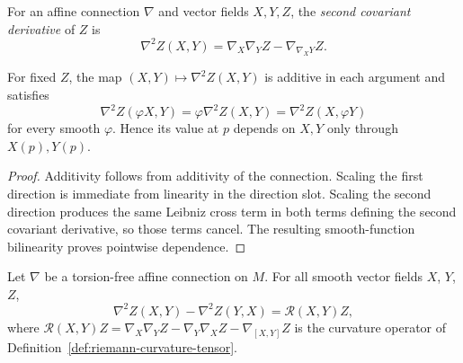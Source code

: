 \begin{definition}
\label{def:second-covariant-derivative-vector-field}
\leanok



For an affine connection $\nabla$ and vector fields $X,Y,Z$, the
\emph{second covariant derivative} of $Z$ is
\[
  \nabla^2Z(X,Y)=\nabla_X\nabla_YZ-\nabla_{\nabla_XY}Z.
\]
\end{definition}

\begin{lemma}
\label{lem:second-covariant-derivative-tensorial}



For fixed $Z$, the map $(X,Y)\mapsto\nabla^2Z(X,Y)$ is additive in
each argument and satisfies
\[
  \nabla^2Z(\varphi X,Y)=\varphi\nabla^2Z(X,Y)
  =\nabla^2Z(X,\varphi Y)
\]
for every smooth $\varphi$. Hence its value at $p$ depends on $X,Y$
only through $X(p),Y(p)$.
\end{lemma}

\begin{proof}
\sketch
{}
\leanok
Additivity follows from additivity of the connection. Scaling the first direction is immediate from linearity in the direction slot. Scaling the second direction produces the same Leibniz cross term in both terms defining the second covariant derivative, so those terms cancel. The resulting smooth-function bilinearity proves pointwise dependence.
\end{proof}

\begin{lemma}
\label{lem:ricci-commutation-vector-field}
\leanok



Let $\nabla$ be a torsion-free affine connection on $M$. For all
smooth vector fields $X$, $Y$, $Z$,
$$\nabla^2Z(X,Y)-\nabla^2Z(Y,X)={\mathcal R}(X,Y)Z,$$
where ${\mathcal R}(X,Y)Z
=\nabla_X\nabla_YZ-\nabla_Y\nabla_XZ-\nabla_{[X,Y]}Z$ is the
curvature operator of Definition~\ref{def:riemann-curvature-tensor}.
\end{lemma}

